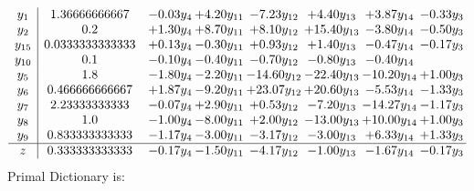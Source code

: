 \documentclass[9pt]{article}
\begin{document}
\[\begin{array}{c| c c@{\hskip 2pt} c@{\hskip 2pt} c@{\hskip 2pt} c@{\hskip 2pt} c@{\hskip 2pt} c@{\hskip 2pt} }
 y_{1}   &  1.36666666667 & -0.03 y_{4} & +  4.20 y_{11} & -7.23 y_{12} & +  4.40 y_{13} & +  3.87 y_{14} & -0.33 y_{3}\\
 y_{2}   &  0.2 & +  1.30 y_{4} & +  8.70 y_{11} & +  8.10 y_{12} & + 15.40 y_{13} & -3.80 y_{14} & -0.50 y_{3}\\
 y_{15}   &  0.0333333333333 & +  0.13 y_{4} & -0.30 y_{11} & +  0.93 y_{12} & +  1.40 y_{13} & -0.47 y_{14} & -0.17 y_{3}\\
 y_{10}   &  0.1 & -0.10 y_{4} & -0.40 y_{11} & -0.70 y_{12} & -0.80 y_{13} & -0.40 y_{14} &   \\
 y_{5}   &  1.8 & -1.80 y_{4} & -2.20 y_{11} & -14.60 y_{12} & -22.40 y_{13} & -10.20 y_{14} & +  1.00 y_{3}\\
 y_{6}   &  0.466666666667 & +  1.87 y_{4} & -9.20 y_{11} & + 23.07 y_{12} & + 20.60 y_{13} & -5.53 y_{14} & -1.33 y_{3}\\
 y_{7}   &  2.23333333333 & -0.07 y_{4} & +  2.90 y_{11} & +  0.53 y_{12} & -7.20 y_{13} & -14.27 y_{14} & -1.17 y_{3}\\
 y_{8}   &  1.0 & -1.00 y_{4} & -8.00 y_{11} & +  2.00 y_{12} & -13.00 y_{13} & + 10.00 y_{14} & +  1.00 y_{3}\\
 y_{9}   &  0.833333333333 & -1.17 y_{4} & -3.00 y_{11} & -3.17 y_{12} & -3.00 y_{13} & +  6.33 y_{14} & +  1.33 y_{3}\\
\hline
z    &  0.333333333333 & -0.17 y_{4} & -1.50 y_{11} & -4.17 y_{12} & -1.00 y_{13} & -1.67 y_{14} & -0.17 y_{3}\\
\end{array}\]
Primal Dictionary is:
\end{document}
